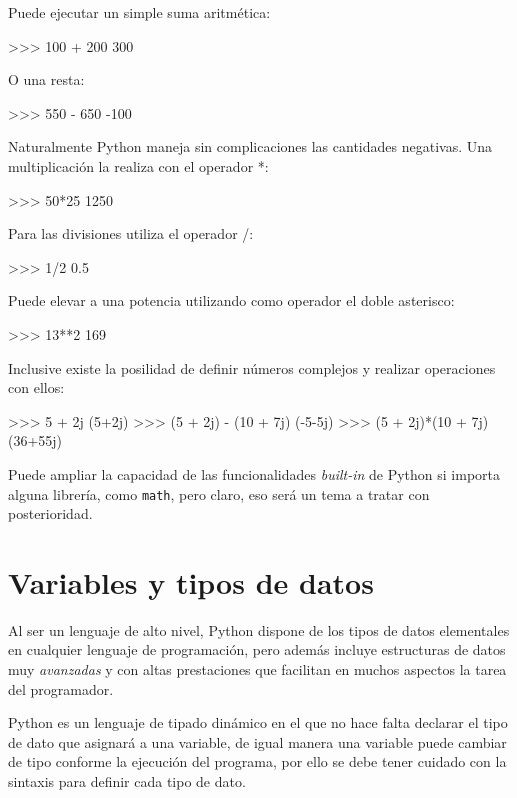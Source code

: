 Puede ejecutar un simple suma aritmética:

\begin{python}
>>> 100 + 200
300
\end{python}

O una resta:

\begin{python}
>>> 550 - 650
-100
\end{python}

Naturalmente Python maneja sin complicaciones las cantidades negativas. Una multiplicación la realiza 
con el operador *:

\begin{python}
>>> 50*25
1250
\end{python}

Para las divisiones utiliza el operador /:

\begin{python}
>>> 1/2
0.5
\end{python}

Puede elevar a una potencia utilizando como operador el doble asterisco:

\begin{python}
>>> 13**2
169
\end{python}

Inclusive existe la posilidad de definir números complejos y realizar operaciones con ellos:

\begin{python}
>>> 5 + 2j
(5+2j)
>>> (5 + 2j) - (10 + 7j)
(-5-5j)
>>> (5 + 2j)*(10 + 7j)
(36+55j)
\end{python}

Puede ampliar la capacidad de las funcionalidades \textit{built-in} de Python si importa alguna librería, como 
\texttt{math}, pero claro, eso será un tema a tratar con posterioridad.

\section{Variables y tipos de datos}

Al ser un lenguaje de alto nivel, Python dispone de los tipos de datos elementales en cualquier lenguaje de programación, 
pero además incluye estructuras de datos muy \textit{avanzadas} y con altas prestaciones que facilitan en muchos 
aspectos la tarea del programador.

Python es un lenguaje de tipado dinámico en el que no hace falta declarar el tipo de dato que asignará a una variable, 
de igual manera una variable puede cambiar de tipo conforme la ejecución del programa, por ello se debe tener cuidado 
con la sintaxis para definir cada tipo de dato.


